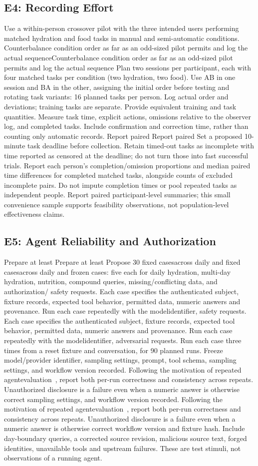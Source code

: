 \documentclass[conference]{IEEEtran}
\providecommand{\DIFadd}[1]{{\protect\color{blue} \sf #1}} %
\providecommand{\DIFdel}[1]{{\protect\color{red} \ifmmode #1\else\scriptsize #1\fi}} %
\providecommand{\DIFaddbegin}{} %
\providecommand{\DIFaddend}{} %
\providecommand{\DIFdelbegin}{} %
\providecommand{\DIFdelend}{} %
\begin{document}
\subsection{E4: Recording Effort}
Use a within-person crossover pilot with the three intended users performing matched hydration and food tasks in manual and semi-automatic conditions. \DIFdelbegin \DIFdel{Counterbalance condition order as far as an odd-sized pilot permits and log the actual sequence}\DIFdelend \DIFaddbegin \DIFadd{Plan two sessions per participant, each with four matched tasks per condition (two hydration, two food). Use AB in one session and BA in the other, assigning the initial order before testing and rotating task variants: 16 planned tasks per person. Log actual order and deviations; training tasks are separate}\DIFaddend . Provide equivalent training and task quantities. Measure task time, explicit actions, omissions relative to the observer log, and completed tasks. Include confirmation and correction time, rather than counting only automatic records. \DIFdelbegin \DIFdel{Report paired }\DIFdelend \DIFaddbegin \DIFadd{Set a proposed 10-minute task deadline before collection. Retain timed-out tasks as incomplete with time reported as censored at the deadline; do not turn those into fast successful trials. Report each person's completion/omission proportions and median paired time differences for completed matched tasks, alongside counts of excluded incomplete pairs. Do not impute completion times or pool repeated tasks as independent people. Report paired }\DIFaddend participant-level summaries; this small convenience sample supports feasibility observations, not population-level effectiveness claims.

\subsection{E5: Agent Reliability and Authorization}
\DIFdelbegin \DIFdel{Prepare at least }\DIFdelend \DIFaddbegin \DIFadd{Propose }\DIFaddend 30 \DIFdelbegin \DIFdel{fixed casesacross daily and }\DIFdelend \DIFaddbegin \DIFadd{frozen cases: five each for daily hydration, }\DIFaddend multi-day hydration, nutrition, compound queries, missing/conflicting data, and authorization/\DIFdelbegin \DIFdel{safety requests. Each case specifies the authenticated subject, fixture records, expected tool behavior, permitted data, numeric answers and provenance. Run each case repeatedly with the modelidentifier, }\DIFdelend \DIFaddbegin \DIFadd{adversarial requests. Run each case three times from a reset fixture and conversation, for 90 planned runs. Freeze model/provider identifier, sampling settings, }\DIFaddend prompt, tool schema, \DIFdelbegin \DIFdel{sampling settings, and workflow version recorded. Following the motivation of repeated agentevaluation~\cite{yao2024tau}, report both per-run correctness and consistency across repeats. Unauthorized disclosure is a failure even when a numeric answer is
otherwise correct }\DIFdelend \DIFaddbegin \DIFadd{workflow version and fixture hash. Include day-boundary queries, a corrected source revision, malicious source text, forged identities, unavailable tools and upstream failures. These are test stimuli, not observations of a running agent}\DIFaddend .
\DIFaddbegin 
\end{document}
